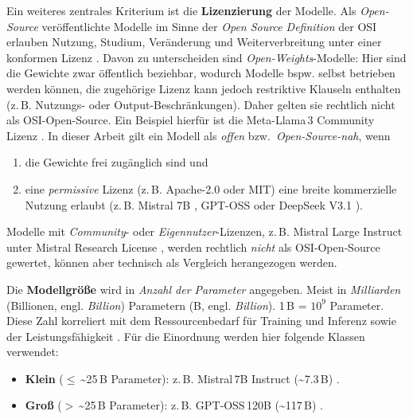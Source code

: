 Ein weiteres zentrales Kriterium ist die \textbf{Lizenzierung} der Modelle. Als \emph{Open-Source} veröffentlichte Modelle im Sinne der \emph{Open Source Definition} der \ac{OSI} erlauben Nutzung, Studium, Veränderung und Weiterverbreitung unter einer konformen Lizenz \cite{OSI_OSD}. Davon zu unterscheiden sind \emph{Open-Weights}-Modelle: Hier sind die Gewichte zwar öffentlich beziehbar, wodurch Modelle bspw. selbst betrieben werden können, die zugehörige Lizenz kann jedoch restriktive Klauseln enthalten (z.\,B. Nutzungs- oder Output-Beschränkungen). Daher gelten sie rechtlich nicht als \ac{OSI}-Open-Source. Ein Beispiel hierfür ist die Meta-Llama\,3 Community Lizenz \cite{Llama3_License}. In dieser Arbeit gilt ein Modell als \emph{offen} bzw.\ \emph{Open-Source-nah}, wenn

\begin{enumerate}
    \item die Gewichte frei zugänglich sind und
    \item eine \emph{permissive} Lizenz (z.\,B. Apache-2.0 oder MIT) eine breite kommerzielle Nutzung erlaubt (z.\,B. Mistral 7B \cite{HF_Mistral7B_2025}, GPT-OSS \cite{OpenAI_GPTOSS_ModelCard_2025, OpenAI_GPTOSS_Blog_2025} oder DeepSeek V3.1 \cite{HF_DeepSeek_V3_1_2025}).
\end{enumerate}

Modelle mit \emph{Community}- oder \emph{Eigennutzer}-Lizenzen, z.\,B. Mistral Large Instruct unter Mistral Research License \cite{HF_MistralLargeInstruct_2025, MRL_Research_License}, werden rechtlich \emph{nicht} als \ac{OSI}‑Open‑Source gewertet, können aber technisch als Vergleich herangezogen werden.

Die \textbf{Modellgröße} wird in \emph{Anzahl der Parameter} angegeben. Meist in \emph{Milliarden} (Billionen, engl. \emph{Billion}) Parametern (B, engl. \emph{Billion}). 1\,B = \(10^9\) Parameter. Diese Zahl korreliert mit dem Ressourcenbedarf für Training und Inferenz sowie der Leistungsfähigkeit \cite{webdev-llm-sizes}. Für die Einordnung werden hier folgende Klassen verwendet:

\begin{itemize}
    \item \textbf{Klein} (\(\leq\)\,\textasciitilde{}25\,B Parameter): z.\,B. Mistral\,7B Instruct (\textasciitilde{}7.3\,B) \cite{HF_Mistral7B_2025}.
    \item \textbf{Groß} (\(>\)\,\textasciitilde{}25\,B Parameter): z.\,B. GPT‑OSS\,120B (\textasciitilde{}117\,B) \cite{OpenAI_GPTOSS_ModelCard_2025}.
\end{itemize}

